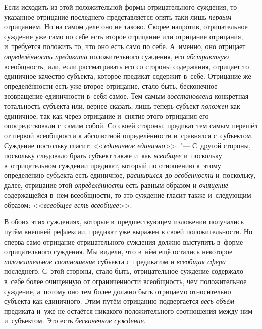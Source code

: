 Если исходить из этой положительной формы отрицательного суждения, то указанное
отрицание последнего представляется опять-таки лишь {\em первым} отрицанием.
Но на самом деле оно не таково. Скорее напротив, отрицательное суждение уже
само по себе есть второе отрицание или отрицание отрицания, и~требуется
положить то, что оно есть само по себе. А~именно, оно отрицает
{\em определённость предиката} положительного суждения, его {\em абстрактную}
всеобщность, или, если рассматривать его со стороны содержания, отрицает то
единичное качество субъекта, которое предикат содержит в~себе. Отрицание же
определённости есть уже второе отрицание, стало быть, бесконечное возвращение
единичности в~себя самое. Тем самым {\em восстановлена} конкретная тотальность
субъекта или, вернее сказать, лишь теперь субъект {\em положен} как единичное,
так как через отрицание и~снятие этого отрицания его опосредствовали с~самим
собой. Со своей стороны, предикат тем самым перешёл от первой всеобщности к
абсолютной определённости и~сравнялся с~субъектом. Суждение постольку гласит:
<<{\em единичное единично}>>. "--- С~другой стороны, поскольку следовало брать
субъект также и~как {\em всеобщее} и~поскольку в~отрицательном суждении
предикат, который по отношению к~этому определению субъекта есть единичное,
{\em расширился} до {\em особенности} и~поскольку, далее, отрицание этой
{\em определённости} есть равным образом и {\em очищение} содержащейся в~нём
всеобщности, то это суждение гласит также и~следующим образом:
<<{\em всеобщее есть всеобщее}>>.

В обоих этих суждениях, которые в~предшествующем
изложении
получались путём внешней рефлексии, предикат уже выражен в
своей положительности. Но сперва само отрицание отрицательного суждения
должно выступить в~форме отрицательного суждения. Мы видели, что в~нём ещё
остались некоторое {\em положительное соотношение} субъекта с~предикатом и
{\em всеобщая сфера} последнего. С~этой стороны, стало быть,
отрицательное суждение содержало в~себе более очищенную от ограниченности
всеобщность, чем положительное суждение, а~потому оно тем более должно быть
отрицаемо относительно субъекта как единичного. Этим путём отрицанию
подвергается {\em весь объём} предиката и~уже не остаётся никакого
положительного соотношения между ним и~субъектом. Это есть
{\em бесконечное суждение}.


